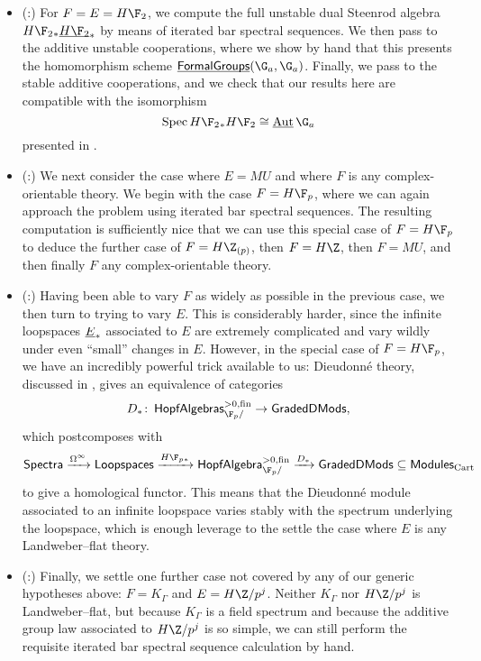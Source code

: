 \begin{itemize}
\item (:) For $F = E = H\F_2$, we compute the full unstable dual Steenrod algebra $H\F_2{}_* \OS{H\F_2}{*}$ by means of iterated bar spectral sequences.  We then pass to the additive unstable cooperations, where we show by hand that this presents the homomorphism scheme $\InternalHom{FormalGroups}(\G_a, \G_a)$.  Finally, we pass to the stable additive cooperations, and we check that our results here are compatible with the isomorphism \[\Spec H\F_2{}_* H\F_2 \cong \InternalAut{\G_a}\] presented in .
\item (:) We next consider the case where $E = MU$ and where $F$ is any complex-orientable theory.  We begin with the case $F = H\F_p$, where we can again approach the problem using iterated bar spectral sequences.  The resulting computation is sufficiently nice that we can use this special case of $F = H\F_p$ to deduce the further case of $F = H\Z_{(p)}$, then $F = H\Z$, then $F = MU$, and then finally $F$ any complex-orientable theory.
\item (:) Having been able to vary $F$ as widely as possible in the previous case, we then turn to trying to vary $E$.  This is considerably harder, since the infinite loopspaces $\underline{\smash{E}}_{*}$ associated to $E$ are extremely complicated and vary wildly under even ``small'' changes in $E$.  However, in the special case of $F = H\F_p$, we have an incredibly powerful trick available to us: Dieudonn\'e theory, discussed in , gives an equivalence of categories \[D_*\co \CatOf{HopfAlgebras}^{> 0, \fin}_{\F_p/} \to \CatOf{GradedDMods},\] which postcomposes with \[\CatOf{Spectra} \xrightarrow{\Loops^\infty} \CatOf{Loopspaces} \xrightarrow{H\F_p{}_*} \CatOf{HopfAlgebra}^{>0, \fin}_{\F_p/} \xrightarrow{D_*} \CatOf{GradedDMods} \subseteq \CatOf{Modules}_{\Cart}\] to give a homological functor.  This means that the Dieudonn\'e module associated to an infinite loopspace varies stably with the spectrum underlying the loopspace, which is enough leverage to the settle the case where $E$ is any Landweber--flat theory.
\item (:) Finally, we settle one further case not covered by any of our generic hypotheses above: $F = K_\Gamma$ and $E = H\Z/p^j$.  Neither $K_\Gamma$ nor $H\Z/p^j$ is Landweber--flat, but because $K_\Gamma$ is a field spectrum and because the additive group law associated to $H\Z/p^j$ is so simple, we can still perform the requisite iterated bar spectral sequence calculation by hand.
\end{itemize}

